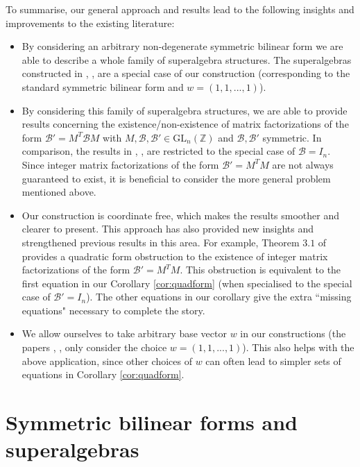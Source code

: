 \documentclass{amsart}
\theoremstyle{plain}
\theoremstyle{definition}
\begin{document}
To summarise, our general approach and results lead to the following insights and improvements to the existing literature:

\begin{itemize}
\item{By considering an arbitrary non-degenerate symmetric bilinear form we are able to describe a whole family of superalgebra structures. The superalgebras constructed in \cite{higham}, \cite{hill}, \cite{lettington} are a special case of our construction (corresponding to the standard symmetric bilinear form and $w = (1,1,...,1)$).}
\item{By considering this family of superalgebra structures, we are able to provide results concerning the existence/non-existence of matrix factorizations of the form $\mathcal{B}' = M^T\mathcal{B}M$ with $M,\mathcal{B},\mathcal{B}'\in\text{GL}_n(\mathbb{Z})$ and $\mathcal{B},\mathcal{B}'$ symmetric. In comparison, the results in \cite{higham}, \cite{hill}, \cite{lettington} are restricted to the special case of $\mathcal{B} = I_n$. Since integer matrix factorizations of the form $\mathcal{B}' = M^TM$ are not always guaranteed to exist, it is beneficial to consider the more general problem mentioned above.}

\item{Our construction is coordinate free, which makes the results smoother and clearer to present. This approach has also provided new insights and strengthened previous results in this area. For example, Theorem $3.1$ of \cite{higham} provides a quadratic form obstruction to the existence of integer matrix factorizations of the form $\mathcal{B}' = M^TM$. This obstruction is equivalent to the first equation in our Corollary \ref{cor:quadform} (when specialised to the special case of $\mathcal{B}' = I_n$). The other equations in our corollary give the extra ``missing equations" necessary to complete the story.}

\item{We allow ourselves to take arbitrary base vector $w$ in our constructions (the papers \cite{higham}, \cite{hill}, \cite{lettington} only consider the choice $w = (1,1,...,1)$). This also helps with the above application, since other choices of $w$ can often lead to simpler sets of equations in Corollary \ref{cor:quadform}.}
\end{itemize}

\section{Symmetric bilinear forms and superalgebras}
\end{document}
